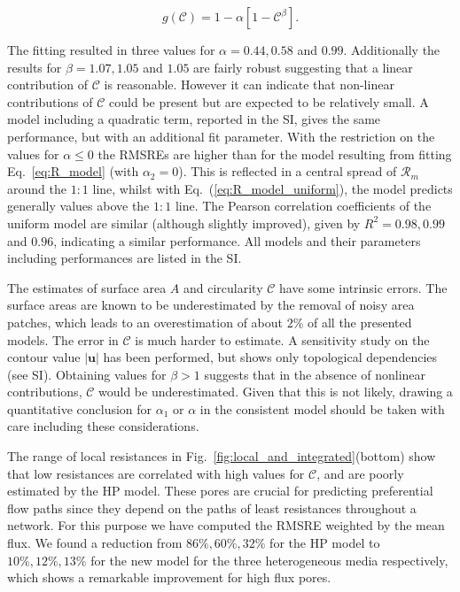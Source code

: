 \documentclass[draft]{agujournal2019}
\begin{document}
\begin{equation}
	g(\mathcal{C}) = 1-\alpha\left[1-\mathcal{C}^{\beta}\right] \label{eq:R_model_uniform}.
\end{equation}

The fitting resulted in three values for $\alpha = 0.44, 0.58$ and $0.99$. Additionally the results for $\beta = 1.07,1.05$ and $1.05$ are fairly robust suggesting that a linear contribution of $\mathcal{C}$ is reasonable. However it can indicate that non-linear contributions of $\mathcal{C}$ could be present but are expected to be relatively small. A model including a quadratic term, reported in the SI, gives the same performance, but with an additional fit parameter. With the restriction on the values for $\alpha\leq0$ the RMSREs are higher than for the model resulting from fitting Eq.~\ref{eq:R_model} (with $\alpha_2 = 0$). This is reflected in a central spread of $\mathcal{R}_m$ around the $1:1$ line, whilst with Eq.~(\ref{eq:R_model_uniform}), the model predicts generally values above the $1:1$ line. The Pearson correlation coefficients of the uniform model are similar (although slightly improved), given by $R^2 = 0.98, 0.99$ and $0.96$, indicating a similar performance. All models and their parameters including performances are listed in the SI.


The estimates of surface area $A$ and circularity $\mathcal{C}$ have some intrinsic errors. The surface areas are known to be underestimated by the removal of noisy area patches, which leads to an overestimation of about $2\%$ of all the presented models. The error in $\mathcal{C}$ is much harder to estimate. A sensitivity study on the contour value $|\mathbf{u}|$ has been performed, but shows only topological dependencies (see SI). Obtaining values for $\beta>1$ suggests that in the absence of nonlinear contributions, $\mathcal{C}$ would be underestimated. Given that this is not likely, drawing a quantitative conclusion for $\alpha_1$ or $\alpha$ in the consistent model should be taken with care including these considerations.  

The range of local resistances in Fig.~\ref{fig:local_and_integrated}(bottom) show that low resistances are correlated with high values for $\mathcal{C}$, and are poorly estimated by the HP model. These pores are crucial for predicting preferential flow paths since they depend on the paths of least resistances throughout a network. For this purpose we have computed the RMSRE weighted by the mean flux. We found a reduction from $86\%, 60\%, 32\%$ for the HP model to $10\%, 12\%, 13\%$ for the new model for the three heterogeneous media respectively, which shows a remarkable improvement for high flux pores.  
\end{document}
